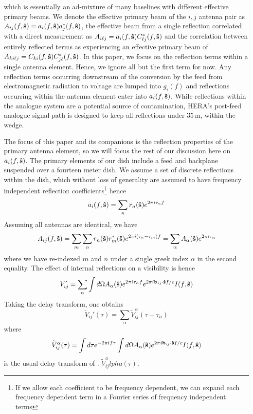 \documentclass[preprint]{emulateapj}
\begin{document}
which is essentially an ad-mixture of many baselines with different effective primary beams. We denote the effective primary beam of the $i,j$ antenna pair as $A_{ij}(f,{\bf \hat{s}})=a_i(f,{\bf \hat{s}})a_j^*(f,{\bf \hat{s}})$, the effective beam from a single reflection correlated with a direct measurement as $A_{i \ell j} = a_i(f,{\bf \hat{s}}) C^*_{\ell j}(f,{\bf \hat{s}})$ and the correlation between entirely reflected terms as experiencing an effective primary beam of $A_{k i \ell j}=C_{ki}(f,{\bf \hat{s}}) C^*_{j \ell}(f,{\bf \hat{s}})$. In this paper, we focus on the reflection terms within a single antenna element. Hence, we ignore all but the first term for now. Any reflection terms occurring downstream of the conversion by the feed from electromagnetic radiation to voltage are lumped into $g_i(f)$ and reflections occurring within the antenna element enter into $a_i(f,{\bf \hat{s}})$. While reflections within the analogue system are a potential source of contamination, HERA's post-feed analogue signal path is designed to keep all reflections under 35\,m, within the wedge. 

The focus of this paper and its companions is the reflection properties of the primary antenna element, so we will focus the rest of our discussion here on $a_i(f,{\bf \hat{s}})$. The primary elements of our dish include a feed and backplane suspended over a fourteen meter dish. We assume a set of discrete reflections within the dish, which without loss of generality are assumed to have frequency independent reflection coefficients\footnote{If we allow each coefficient to be frequency dependent, we can expand each frequency dependent term in a Fourier series of frequency independent terms} hence 
\begin{equation}
a_i(f,{\bf \hat{s}}) = \sum_{n} r_n({\bf \hat{s}}) e^{2 \pi i  \tau_n f}
\end{equation}
Assuming all antennas are identical, we have
\begin{equation}
A_{ij}(f,{\bf \hat{s}}) = \sum_m \sum_n r_n({\bf \hat{s}}) r_m^*({\bf \hat{s}}) e^{2 \pi i(\tau_n-\tau_m)f} = \sum_\alpha A_\alpha({\bf \hat{s}}) e^{2 \pi i \tau_\alpha}
\end{equation}
where we have re-indexed $m$ and $n$ under a single greek index $\alpha$ in the second equality. The effect of internal reflections on a visibility is hence
\begin{equation}
V_{ij}'= \sum_\alpha \int d \Omega A_\alpha({\bf \hat{s}}) e^{2 \pi i \tau_\alpha f} e^{2 \pi i {\bf b}_{ij} \cdot {\bf \hat{s}}f/c} I(f,{\bf \hat{s}})
\end{equation}
Taking the delay transform, one obtains
\begin{equation}
\widetilde{V}_{ij}'(\tau) = \sum_\alpha \widetilde{V}_{ij}^\alpha (\tau - \tau_\alpha)
\end{equation}
where 
\begin{equation}
\widetilde{V}^\alpha_{ij}(\tau) = \int d \tau e^{-2 \pi i f \tau} \int d \Omega A_\alpha({\bf \hat{s}}) e^{2 \pi i {\bf b}_{ij} \cdot {\bf \hat{s}} f/c} I(f,{\bf \hat{s}})
\end{equation}
is the usual delay transform of \citet{Parsons:2012}. $\widetilde{V}_{ij}^alpha(\tau)$.
\end{document}
